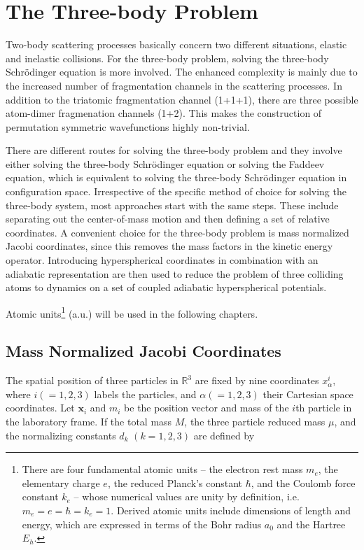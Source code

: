 \chapter{The Three-body Problem}
Two-body scattering processes basically concern two different situations, elastic and inelastic collisions. For the three-body problem, solving the three-body Schr{\"o}dinger equation is more involved. The enhanced complexity is mainly due to the increased number of fragmentation channels in the scattering processes. In addition to the triatomic fragmentation channel (1+1+1), there are three possible atom-dimer fragmenation channels (1+2). This makes the construction of permutation symmetric wavefunctions highly non-trivial. 

There are different routes for solving the three-body problem and they involve either solving the three-body Schr{\"o}dinger equation or solving the Faddeev equation, which is equivalent to solving the three-body Schr{\"o}dinger equation in configuration space. Irrespective of the specific method of choice for solving the three-body system, most approaches start with the same steps. These include separating out the center-of-mass motion and then defining a set of relative coordinates. A convenient choice for the three-body problem is mass normalized Jacobi coordinates, since this removes the mass factors in the kinetic energy operator. Introducing hyperspherical coordinates in combination with an adiabatic representation are then used to reduce the problem of three colliding atoms to dynamics on a set of coupled adiabatic hyperspherical potentials.

Atomic units\footnote{There are four fundamental atomic units -- the electron rest mass $m_e$, the elementary charge $e$, the reduced Planck's constant $\hbar$, and the Coulomb force constant $k_e$ -- whose numerical values are unity by definition, i.e. $m_e = e = \hbar = k_e = 1$. Derived atomic units include dimensions of length and energy, which are expressed in terms of the Bohr radius $a_0$ and the Hartree $E_h$.    } (a.u.) will be used in the following chapters. 

\section{Mass Normalized Jacobi Coordinates}\label{MNJC}
The spatial position of three particles in $\mathbb{R}^3$ are fixed by nine coordinates $x_{\alpha}^{i}$, where $i(=1,2,3)$ labels the particles, and $\alpha(=1,2,3)$ their Cartesian space coordinates. Let $\mathbf{x}_i$ and $m_{i}$ be the position vector and mass of the $i$th particle in the laboratory frame. If the total mass $M$, the three particle reduced mass $\mu$, and the normalizing constants $d_{k}$ $(k=1,2,3)$ are defined by

